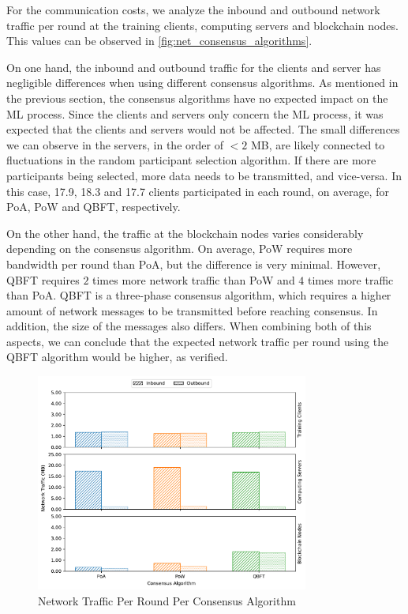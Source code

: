 For the communication costs, we analyze the inbound and outbound network traffic per round at the training clients, computing servers and blockchain nodes. This values can be observed in \autoref{fig:net_consensus_algorithms}.

On one hand, the inbound and outbound traffic for the clients and server has negligible differences when using different consensus algorithms. As mentioned in the previous section, the consensus algorithms have no expected impact on the ML process. Since the clients and servers only concern the ML process, it was expected that the clients and servers would not be affected. The small differences we can observe in the servers, in the order of $< 2$ MB, are likely connected to fluctuations in the random participant selection algorithm. If there are more participants being selected, more data needs to be transmitted, and vice-versa. In this case, 17.9, 18.3 and 17.7 clients participated in each round, on average, for PoA, PoW and QBFT, respectively.

On the other hand, the traffic at the blockchain nodes varies considerably depending on the consensus algorithm. On average, PoW requires more bandwidth per round than PoA, but the difference is very minimal. However, QBFT requires $2$ times more network traffic than PoW and $4$ times more traffic than PoA. QBFT is a three-phase consensus algorithm, which requires a higher amount of network messages to be transmitted before reaching consensus. In addition, the size of the messages also differs. When combining both of this aspects, we can conclude that the expected network traffic per round using the QBFT algorithm would be higher, as verified.

\begin{figure}[!ht]
    \centering
    \centering
    \includegraphics[width=0.8\textwidth]{graphics/consensus/net.pdf}
    \caption{Network Traffic Per Round Per Consensus Algorithm}
    \label{fig:net_consensus_algorithms}
\end{figure}


